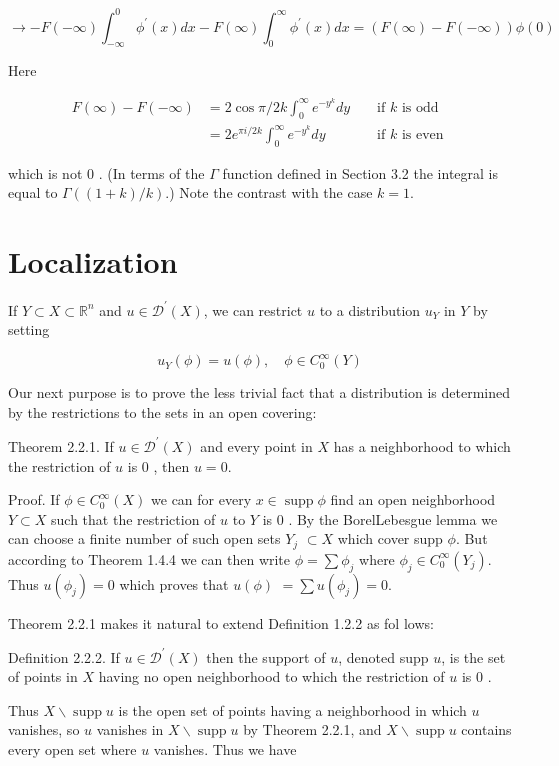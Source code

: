 \[
\rightarrow-F(-\infty) \int_{-\infty}^{0} \phi^{\prime}(x) d x-F(\infty) \int_{0}^{\infty} \phi^{\prime}(x) d x=(F(\infty)-F(-\infty)) \phi(0)
\]

Here

\[
\begin{aligned}
F(\infty)-F(-\infty) & =2 \cos \pi / 2 k \int_{0}^{\infty} e^{-y^{k}} d y & & \text { if } k \text { is odd } \\
& =2 e^{\pi i / 2 k} \int_{0}^{\infty} e^{-y^{k}} d y & & \text { if } k \text { is even }
\end{aligned}
\]

which is not 0 . (In terms of the $\Gamma$ function defined in Section 3.2 the integral is equal to $\Gamma((1+k) / k)$.) Note the contrast with the case $k=1$.

\section{Localization}
If $Y \subset X \subset \mathbb{R}^{n}$ and $u \in \mathscr{D}^{\prime}(X)$, we can restrict $u$ to a distribution $u_{Y}$ in $Y$ by setting

\[
u_{Y}(\phi)=u(\phi), \quad \phi \in C_{0}^{\infty}(Y)
\]

Our next purpose is to prove the less trivial fact that a distribution is determined by the restrictions to the sets in an open covering:

Theorem 2.2.1. If $u \in \mathscr{D}^{\prime}(X)$ and every point in $X$ has a neighborhood to which the restriction of $u$ is 0 , then $u=0$.

Proof. If $\phi \in C_{0}^{\infty}(X)$ we can for every $x \in \operatorname{supp} \phi$ find an open neighborhood $Y \subset X$ such that the restriction of $u$ to $Y$ is 0 . By the BorelLebesgue lemma we can choose a finite number of such open sets $Y_{j}$ $\subset X$ which cover supp $\phi$. But according to Theorem 1.4.4 we can then write $\phi=\sum \phi_{j}$ where $\phi_{j} \in C_{0}^{\infty}\left(Y_{j}\right)$. Thus $u\left(\phi_{j}\right)=0$ which proves that $u(\phi)$ $=\sum u\left(\phi_{j}\right)=0$.

Theorem 2.2.1 makes it natural to extend Definition 1.2.2 as fol lows:

Definition 2.2.2. If $u \in \mathscr{D}^{\prime}(X)$ then the support of $u$, denoted supp $u$, is the set of points in $X$ having no open neighborhood to which the restriction of $u$ is 0 .

Thus $X \backslash \operatorname{supp} u$ is the open set of points having a neighborhood in which $u$ vanishes, so $u$ vanishes in $X \backslash \operatorname{supp} u$ by Theorem 2.2.1, and $X \backslash \operatorname{supp} u$ contains every open set where $u$ vanishes. Thus we have

